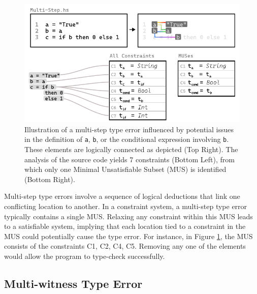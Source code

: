 \begin{figure}[hbt]
  \centering \includegraphics[width=\linewidth]{Multi-Step-MUS}
  \caption[Illustration of a multi-step type error in the context of MUSes]{Illustration of a multi-step type error influenced by potential issues in the definition of \texttt{a}, \texttt{b}, or the conditional expression involving \texttt{b}. These elements are logically connected as depicted (Top Right). The analysis of the source code yields 7 constraints (Bottom Left), from which only one Minimal Unsatisfiable Subset (MUS) is identified (Bottom Right).}
  \label{fig:multi-step-2}
  \end{figure}


Multi-step type errors involve a sequence of logical deductions that link one conflicting location to another. In a constraint system, a multi-step type error typically contains a single MUS. Relaxing any constraint within this MUS leads to a satisfiable system, implying that each location tied to a constraint in the MUS could potentially cause the type error. For instance, in Figure \ref{fig:multi-step-2}, the MUS consists of the constraints {C1, C2, C4, C5}. Removing any one of the elements would allow the program to type-check successfully.

\subsection{Multi-witness Type Error}

